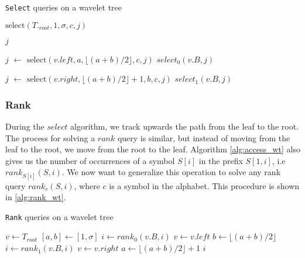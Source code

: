 \begin{algorithm}
    \caption{\texttt{Select} queries on a wavelet tree}\label{alg:select_wt}
    \begin{algorithmic}

        \State \Return $\text{select}(T._{root},1, \sigma, c, j)$
        \EndFunction

        \vspace{0.4cm}

        \State \Return $j$
        \EndIf

        \State $j$ $\gets$ $\text{select}(v.left, a, \lfloor (a+b)/2 \rfloor, c, j)$
        \Return $select_0(v.B,j)$

        \Else
        \State $j$ $\gets$ $\text{select}(v.right, \lfloor (a+b)/2 \rfloor +1, b, c, j)$
        \State \Return $select_1(v.B,j)$
        \EndIf

        \EndFunction

    \end{algorithmic}
\end{algorithm}

\subsubsection{Rank} During the $select$ algorithm, we track upwards the path from the leaf to the root. The process for solving a $rank$ query is similar, but instead of moving from the leaf to the root, we move from the root to the leaf. Algorithm \ref{alg:access_wt} also gives us the number of occurrences of a symbol $S[i]$ in the prefix $S[1,i]$, i.e $rank_{S[i]}(S,i)$. We now want to generalize this operation to solve any rank query $rank_c(S,i)$, where $c$ is a symbol in the alphabet. This procedure is shown in \ref{alg:rank_wt}.
\begin{algorithm}[h!]
    \caption{\texttt{Rank} queries on a wavelet tree}\label{alg:rank_wt}
    \begin{algorithmic}
        \State $v \gets T_{root}$ 
        \State $[a,b] \gets [1,\sigma]$
        \State $i \gets rank_0(v.B,i)$
        \State $v \gets v.left$ 
        \State $b \gets \lfloor (a+b)/2 \rfloor$
        \Else
        \State $i \gets rank_1(v.B,i)$
        \State $v \gets v.right$ 
        \State $a \gets \lfloor (a+b)/2 \rfloor +1$
        \EndIf
        \EndWhile
        \State \Return $i$
        \EndFunction
    \end{algorithmic}

\end{algorithm}

